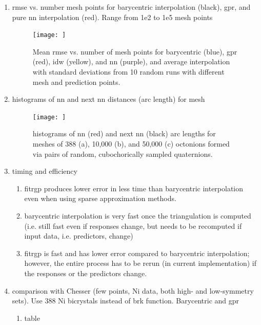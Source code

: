 \documentclass[preprint,12pt]{elsarticle}
\begin{document}
\begin{enumerate}
    \item \Gls{rmse} vs. number mesh points for barycentric interpolation (black), \gls{gpr}, and pure \gls{nn} interpolation (red). Range from 1e2 to 1e5 mesh points
    \begin{figure}
        \centering
        \texttt{[image: ]}
        \caption{Mean \acrlong{rmse} vs. number of mesh points for barycentric (blue), \acrlong{gpr} (red), \acrlong{idw} (yellow), and \acrlong{nn} (purple), and average interpolation with standard deviations from 10 random runs with different mesh and prediction points.}
        \label{fig:brk-rmse}
    \end{figure}
    \item histograms of \gls{nn} and next \gls{nn} distances (arc length) for mesh
    \begin{figure}
        \centering
        \texttt{[image: ]}
        \caption{histograms of \acrfull{nn} (red) and next \acrlong{nn} (black) arc lengths for meshes of 388 (a), 10,000 (b), and 50,000 (c) octonions formed via pairs of random, cubochorically sampled quaternions.}
        \label{fig:nndist}
    \end{figure}
    \item timing and efficiency
    \begin{enumerate}
        \item fitrgp produces lower error in less time than barycentric interpolation even when using sparse approximation methods.
        \item barycentric interpolation is very fast once the triangulation is computed (i.e. still fast even if responses change, but needs to be recomputed if input data, i.e. predictors, change)
        \item fitrgp is fast and has lower error compared to barycentric interpolation; however, the entire process has to be rerun (in current implementation) if the responses or the predictors change.
    \end{enumerate}
    \item comparison with Chesser \cite{Chesser2020LearningProperties} (few points, Ni data, both high- and low-symmetry sets). Use 388 Ni bicrystals instead of \gls{brk} function. Barycentric and \gls{gpr}
    \begin{enumerate}
        \item table
        \begin{table}[]
            \centering
            \begin{tabular}{c c c c}
                \hline

\end{tabular}
\end{table}
\end{enumerate}
\end{enumerate}
\end{document}

